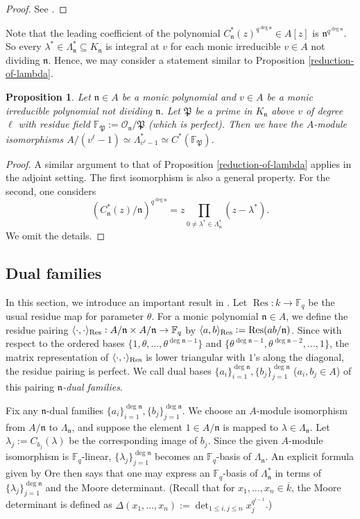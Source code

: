\documentclass[11pt]{amsart}
\theoremstyle{plain}
\newtheorem{prop}[thm]{Proposition}
\theoremstyle{definition}
\theoremstyle{remark}
\numberwithin{equation}{section}
\newcommand{\FF}{\mathbb{F}}
\newcommand{\nfk}{\mathfrak{n}}
\newcommand{\Pfk}{\mathfrak{P}}
\newcommand{\Ocal}{\mathcal{O}}
\newcommand{\Res}{\operatorname{Res}}
\newcommand{\ovl}{\overline}
\newcommand{\sbe}{\subseteq}
\newcommand{\Fq}{\FF_q}
\newcommand{\T}{\theta}
\let\l\ell
\DeclarePairedDelimiter{\angres}{\langle}{\rangle_{\textnormal{Res}}}
\begin{document}
	\begin{proof}
		See \cite[Theorem 1.7.11]{goss1996basic}.
	\end{proof}
	
	Note that the leading coefficient of the polynomial $C_\nfk^*(z)^{q^{\deg\nfk}} \in A[z]$ is $\nfk^{q^{\deg \nfk}}$.
	So every $\lambda^* \in \Lambda_\nfk^* \sbe K_\nfk$ is integral at $v$ for each monic irreducible $v \in A$ not dividing $\nfk$.
	Hence, we may consider a statement similar to Proposition \ref{reduction-of-lambda}.
	
	\begin{prop}     \label{reduction-of-lambda*}
		Let $\nfk \in A$ be a monic polynomial and $v \in A$ be a monic irreducible polynomial not dividing $\nfk$.
		Let $\Pfk$ be a prime in $K_\nfk$ above $v$ of degree $\l$ with residue field $\FF_{\Pfk} := \Ocal_\nfk/\Pfk$ (which is perfect).
		Then we have the $A$-module isomorphisms $A/(v^\l-1) \simeq \Lambda^*_{v^\l-1} \simeq C^*(\FF_{\Pfk})$.
	\end{prop}
	
	\begin{proof}
		A similar argument to that of Proposition \ref{reduction-of-lambda} applies in the adjoint setting.
		The first isomorphism is also a general property.
		For the second, one considers
		$$
		(C_\nfk^*(z) / \nfk)^{q^{\deg\nfk}}
		= z\prod_{0 \neq \lambda^* \in \Lambda_\nfk^*} (z - \lambda^*).
		$$
		We omit the details.
	\end{proof}
	
	\subsection{Dual families}       \label{section-dual-families}
	
	In this section, we introduce an important result in \cite{abp2004determination}.
	Let $\Res: k \to \Fq$ be the usual residue map for parameter $\T$.
	For a monic polynomial $\nfk \in A$, we define the residue pairing $\angres{\cdot,\cdot}: A/\nfk \times A/\nfk \to \Fq$ by $\angres{a,b} := \Res(ab/\nfk)$.
	Since with respect to the ordered bases $\{1,\T,\ldots,\T^{\deg\nfk-1}\}$ and $\{\T^{\deg\nfk-1},\T^{\deg\nfk-2},\ldots,1\}$, the matrix representation of $\angres{\cdot,\cdot}$ is lower triangular with $1$'s along the diagonal, the residue pairing is perfect.
	We call dual bases $\{a_i\}_{i=1}^{\deg\nfk}, \{b_j\}_{j=1}^{\deg\nfk}$ ($a_i,b_j\in A$) of this pairing \textit{$\nfk$-dual families}.
	
	Fix any $\nfk$-dual families $\{a_i\}_{i=1}^{\deg\nfk}, \{b_j\}_{j=1}^{\deg\nfk}$.
	We choose an $A$-module isomorphism from $A/\nfk$ to $\Lambda_\nfk$, and suppose the element $1\in A/\nfk$ is mapped to $\lambda \in \Lambda_\nfk$.
	Let $\lambda_j := C_{b_j}(\lambda)$ be the corresponding image of $b_j$.
	Since the given $A$-module isomorphism is $\Fq$-linear, $\{\lambda_j\}_{j=1}^{\deg\nfk}$ becomes an $\Fq$-basis of $\Lambda_\nfk$.
	An explicit formula given by Ore then says that one may express an $\Fq$-basis of $\Lambda_\nfk^*$ in terms of $\{\lambda_j\}_{j=1}^{\deg\nfk}$ and the Moore determinant.
	(Recall that for $x_1,\ldots,x_n \in \ovl{k}$, the Moore determinant is defined as $\Delta(x_1,\ldots,x_n) := \det_{1 \leq i,j \leq n} x_j^{q^{i-1}}$.)
	
\end{document}
